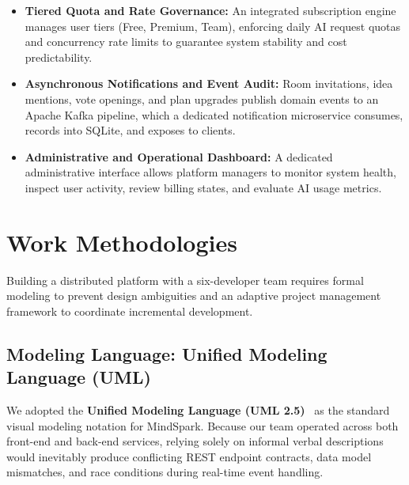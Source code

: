 \begin{itemize}[leftmargin=1.5em]
\begin{itemize}[leftmargin=1.2em]
        \item \textit{Idea Comparison:} Performing side-by-side trade-off evaluations between competing proposals.
        \item \textit{Executive Summarization:} Compiling the entire room's content into an executive briefing document.
    \end{itemize}
    \item \textbf{Tiered Quota and Rate Governance:} An integrated subscription engine manages user tiers (Free, Premium, Team), enforcing daily AI request quotas and concurrency rate limits to guarantee system stability and cost predictability.
    \item \textbf{Asynchronous Notifications and Event Audit:} Room invitations, idea mentions, vote openings, and plan upgrades publish domain events to an Apache Kafka pipeline, which a dedicated notification microservice consumes, records into SQLite, and exposes to clients.
    \item \textbf{Administrative and Operational Dashboard:} A dedicated administrative interface allows platform managers to monitor system health, inspect user activity, review billing states, and evaluate AI usage metrics.
\end{itemize}

\section{Work Methodologies}
\label{sec:work_methodologies}

Building a distributed platform with a six-developer team requires formal modeling to prevent design ambiguities and an adaptive project management framework to coordinate incremental development.

\subsection{Modeling Language: Unified Modeling Language (UML)}
\label{subsec:uml_methodology}

We adopted the \textbf{Unified Modeling Language (UML 2.5)}~\cite{omg2015uml} as the standard visual modeling notation for MindSpark. Because our team operated across both front-end and back-end services, relying solely on informal verbal descriptions would inevitably produce conflicting REST endpoint contracts, data model mismatches, and race conditions during real-time event handling. 

